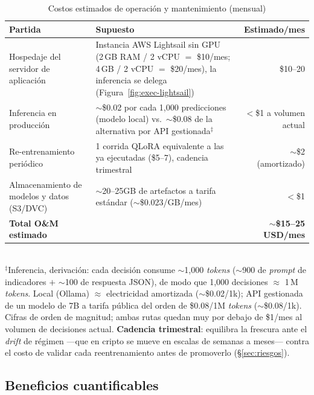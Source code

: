 \documentclass[11pt]{article}
\begin{document}
\begin{table}[H]
\centering
\caption{Costos estimados de operaci\'on y mantenimiento (mensual)}
\label{tab:costos-om}
\small
\begin{tabularx}{\linewidth}{lXr}
\toprule
\textbf{Partida} & \textbf{Supuesto} & \textbf{Estimado/mes} \\
\midrule
Hospedaje del servidor de aplicaci\'on & Instancia AWS Lightsail sin GPU (2\,GB RAM / 2 vCPU $=$ \$10/mes; 4\,GB / 2 vCPU $=$ \$20/mes), la inferencia se delega (Figura~\ref{fig:exec-lightsail}) & \$10--20 \\
Inferencia en producci\'on & $\sim$\$0.02 por cada 1{,}000 predicciones (modelo local) vs.\ $\sim$\$0.08 de la alternativa por API gestionada$^\ddagger$ & $<$\$1 a volumen actual \\
Re-entrenamiento peri\'odico & 1 corrida QLoRA equivalente a las ya ejecutadas (\$5--7), cadencia trimestral & $\sim$\$2 (amortizado) \\
Almacenamiento de modelos y datos (S3/DVC) & $\sim$20--25GB de artefactos a tarifa est\'andar ($\sim$\$0.023/GB/mes) & $<$\$1 \\
\midrule
\textbf{Total O\&M estimado} & & \textbf{$\sim$\$15--25 USD/mes} \\
\bottomrule
\end{tabularx}
\\[0.3em]
{\scriptsize $^\ddagger$Inferencia, derivaci\'on: cada decisi\'on consume $\sim$1{,}000 \textit{tokens} ($\sim$900 de \textit{prompt} de indicadores $+$ $\sim$100 de respuesta JSON), de modo que 1{,}000 decisiones $\approx$ 1\,M \textit{tokens}. Local (Ollama) $\approx$ electricidad amortizada ($\sim$\$0.02/1k); API gestionada de un modelo de 7B a tarifa p\'ublica del orden de \$0.08/1M \textit{tokens} ($\sim$\$0.08/1k). Cifras de orden de magnitud; ambas rutas quedan muy por debajo de \$1/mes al volumen de decisiones actual. \textbf{Cadencia trimestral}: equilibra la frescura ante el \textit{drift} de r\'egimen ---que en cripto se mueve en escalas de semanas a meses--- contra el costo de validar cada reentrenamiento antes de promoverlo (\S\ref{sec:riesgos}).}
\end{table}

\subsection{Beneficios cuantificables}
\end{document}
